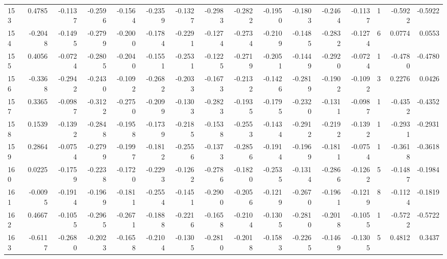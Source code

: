 \begin{tabular}{lrrrrrrrrrrrrrrr}
153 &      0.4785 & -0.1137 & -0.2596 & -0.1564 & -0.2359 & -0.1327 & -0.2983 & -0.2822 & -0.1950 & -0.1803 &  -0.2464 &    -0.1137 &      1 &                   -0.5922 &                    -0.5922 \\
154 &     -0.2048 & -0.1495 & -0.2799 & -0.2000 & -0.1784 & -0.2291 & -0.1274 & -0.2734 & -0.2109 & -0.1485 &  -0.2832 &    -0.1274 &      6 &                    0.0774 &                     0.0553 \\
155 &      0.4056 & -0.0724 & -0.2805 & -0.2040 & -0.1551 & -0.2531 & -0.1225 & -0.2719 & -0.2051 & -0.1449 &  -0.2920 &    -0.0724 &      1 &                   -0.4780 &                    -0.4780 \\
156 &     -0.3368 & -0.2942 & -0.2430 & -0.1092 & -0.2682 & -0.2033 & -0.1673 & -0.2132 & -0.1426 & -0.2819 &  -0.1902 &    -0.1092 &      3 &                    0.2276 &                     0.0426 \\
157 &      0.3365 & -0.0987 & -0.3122 & -0.2750 & -0.2099 & -0.1303 & -0.2823 & -0.1935 & -0.1795 & -0.2320 &  -0.1311 &    -0.0987 &      1 &                   -0.4352 &                    -0.4352 \\
158 &      0.1539 & -0.1392 & -0.2848 & -0.1958 & -0.1739 & -0.2185 & -0.1538 & -0.2553 & -0.1434 & -0.2912 &  -0.2192 &    -0.1392 &      1 &                   -0.2931 &                    -0.2931 \\
159 &      0.2864 & -0.0754 & -0.2799 & -0.1997 & -0.1812 & -0.2556 & -0.1373 & -0.2856 & -0.1914 & -0.1969 &  -0.1811 &    -0.0754 &      1 &                   -0.3618 &                    -0.3618 \\
160 &      0.0225 & -0.1759 & -0.2238 & -0.1720 & -0.2293 & -0.1262 & -0.2786 & -0.1820 & -0.2535 & -0.1314 &  -0.2866 &    -0.1262 &      5 &                   -0.1487 &                    -0.1984 \\
161 &     -0.0095 & -0.1914 & -0.1969 & -0.1811 & -0.2554 & -0.1451 & -0.2900 & -0.2056 & -0.1219 & -0.2670 &  -0.1961 &    -0.1219 &      8 &                   -0.1124 &                    -0.1819 \\
162 &      0.4667 & -0.1055 & -0.2965 & -0.2671 & -0.1888 & -0.2216 & -0.1658 & -0.2104 & -0.1305 & -0.2810 &  -0.2018 &    -0.1055 &      1 &                   -0.5722 &                    -0.5722 \\
163 &     -0.6117 & -0.2680 & -0.2023 & -0.1658 & -0.2104 & -0.1305 & -0.2810 & -0.2018 & -0.1583 & -0.2265 &  -0.1469 &    -0.1305 &      5 &                    0.4812 &                     0.3437 \\

\end{tabular}
